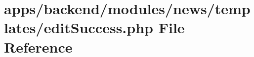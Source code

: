 \hypertarget{backend_2modules_2news_2templates_2edit_success_8php}{\section{apps/backend/modules/news/templates/edit\-Success.php File Reference}
\label{backend_2modules_2news_2templates_2edit_success_8php}
}
